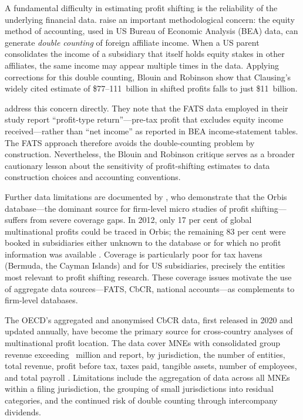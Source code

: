 \documentclass[12pt,a4paper]{article}
\begin{document}
A fundamental difficulty in estimating profit shifting is the reliability of the underlying financial data.
\textcite{blouin2023} raise an important methodological concern: the equity method of accounting, used in US Bureau of Economic Analysis (BEA) data, can generate \emph{double counting} of foreign affiliate income.
When a US parent consolidates the income of a subsidiary that itself holds equity stakes in other affiliates, the same income may appear multiple times in the data.
Applying corrections for this double counting, Blouin and Robinson show that Clausing's widely cited estimate of \$77--111~billion in shifted profits falls to just \$11~billion.

\textcite{torslov2022} address this concern directly.
They note that the FATS data employed in their study report ``profit-type return''---pre-tax profit that excludes equity income received---rather than ``net income'' as reported in BEA income-statement tables.
The FATS approach therefore avoids the double-counting problem by construction.
Nevertheless, the Blouin and Robinson critique serves as a broader cautionary lesson about the sensitivity of profit-shifting estimates to data construction choices and accounting conventions.

Further data limitations are documented by \textcite{ozcan2015}, who demonstrate that the Orbis database---the dominant source for firm-level micro studies of profit shifting---suffers from severe coverage gaps.
In 2012, only 17 per cent of global multinational profits could be traced in Orbis; the remaining 83 per cent were booked in subsidiaries either unknown to the database or for which no profit information was available \parencite{torslov2022}.
Coverage is particularly poor for tax havens (Bermuda, the Cayman Islands) and for US subsidiaries, precisely the entities most relevant to profit shifting research.
These coverage issues motivate the use of aggregate data sources---FATS, CbCR, national accounts---as complements to firm-level databases.

The OECD's aggregated and anonymised CbCR data, first released in 2020 and updated annually, have become the primary source for cross-country analyses of multinational profit location.
The data cover MNEs with consolidated group revenue exceeding ~million and report, by jurisdiction, the number of entities, total revenue, profit before tax, taxes paid, tangible assets, number of employees, and total payroll \parencite{oecd2025corptaxstats}.
Limitations include the aggregation of data across all MNEs within a filing jurisdiction, the grouping of small jurisdictions into residual categories, and the continued risk of double counting through intercompany dividends.
\end{document}
